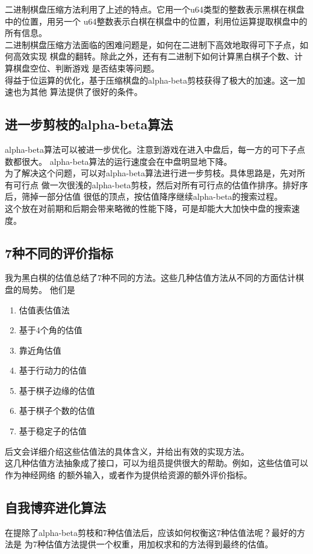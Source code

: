 \documentclass[a4paper]{article}
\begin{document}
二进制棋盘压缩方法利用了上述的特点。它用一个u64类型的整数表示黑棋在棋盘中的位置，用另一个
u64整数表示白棋在棋盘中的位置，利用位运算提取棋盘中的所有信息。\\

二进制棋盘压缩方法面临的困难问题是，如何在二进制下高效地取得可下子点，如何高效实现
棋盘的翻转。除此之外，还有有二进制下如何计算黑白棋子个数、计算棋盘空位、判断游戏
是否结束等问题。\\

得益于位运算的优化，基于压缩棋盘的alpha-beta剪枝获得了极大的加速。这一加速也为其他
算法提供了很好的条件。
\subsection{进一步剪枝的alpha-beta算法}
alpha-beta算法可以被进一步优化。注意到游戏在进入中盘后，每一方的可下子点数都很大。
alpha-beta算法的运行速度会在中盘明显地下降。\\

为了解决这个问题，可以对alpha-beta算法进行进一步剪枝。具体思路是，先对所有可行点
做一次很浅的alpha-beta剪枝，然后对所有可行点的估值作排序。排好序后，筛掉一部分估值
很低的顶点，按估值降序继续alpha-beta的搜索过程。\\

这个放在对前期和后期会带来略微的性能下降，可是却能大大加快中盘的搜索速度。
\subsection{7种不同的评价指标}
我为黑白棋的估值总结了7种不同的方法。这些几种估值方法从不同的方面估计棋盘的局势。
他们是
\begin{enumerate}
    \item 估值表估值法
    \item 基于4个角的估值
    \item 靠近角估值
    \item 基于行动力的估值
    \item 基于棋子边缘的估值
    \item 基于棋子个数的估值
    \item 基于稳定子的估值
\end{enumerate}
后文会详细介绍这些估值法的具体含义，并给出有效的实现方法。\\

这几种估值方法抽象成了接口，可以为组员提供很大的帮助。例如，这些估值可以作为神经网络
的额外输入，或者作为提供给资源的额外评价指标。
\subsection{自我博弈进化算法}
在提除了alpha-beta剪枝和7种估值法后，应该如何权衡这7种估值法呢？最好的方法是
为7种估值方法提供一个权重，用加权求和的方法得到最终的估值。\\
\end{document}
